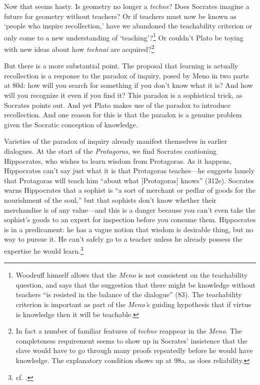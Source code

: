 ﻿\documentclass[11pt]{amsart}
\begin{document}
Now that seems hasty. Is geometry no longer a \emph{techne}? Does Socrates imagine a future for geometry without teachers?  Or if teachers must now be known as `people who inspire recollection,' have we abandoned the teachability criterion or only come to a new understanding of `teaching'?\footnote{Woodruff himself allows that the \emph{Meno} is not consistent on the teachability question, and says that the suggestion that there might be knowledge without teachers ``is resisted in the balance of the dialogue'' (83). The teachability criterion is important as part of the \emph{Meno'}s guiding hypothesis that if virtue is knowledge then it will be teachable.} Or couldn't Plato be toying with new ideas about how \emph{technai} are acquired?\footnote{In fact a number of familiar features of \emph{techne} reappear in the \emph{Meno}. The completeness requirement seems to show up in Socrates' insistence that the slave would have to go through many proofs repeatedly before he would have knowledge. The explanatory condition shows up at 98a, as does reliability.}




But there is a more substantial point. The proposal that learning is actually recollection is a response to the paradox of inquiry, posed by Meno in two parts at 80d: how will you search for something if you don't know what it is? And how will you recognize it even if you find it? This paradox is a sophistical trick, as Socrates points out. And yet Plato makes use of the paradox to introduce recollection. And one reason for this is that the paradox is a genuine problem given the Socratic conception of knowledge.


Varieties of the paradox of inquiry already manifest themselves in earlier dialogues. At the start of the \emph{Protagoras,} we find Socrates cautioning Hippocrates, who wishes to learn wisdom from Protagoras. As it happens, Hippocrates can't say just what it is that Protagoras teaches---he suggests lamely that Protagoras will teach him ``about what [Protagoras] knows'' (312e). Socrates warns Hippocrates that a sophist is ``a sort of merchant or pedlar of goods for the nourishment of the soul,'' but that sophists don't know whether their merchandise is of any value---and this is a danger because you can't even take the sophist's goods to an expert for inspection before you consume them. Hippocrates is in a predicament: he has a vague notion that wisdom is desirable thing, but no way to pursue it. He can't safely go to a teacher unless he already possess the expertise he would learn.\footnote{cf. \citet[10--12]{nehamas1999mps}.}
\end{document}
